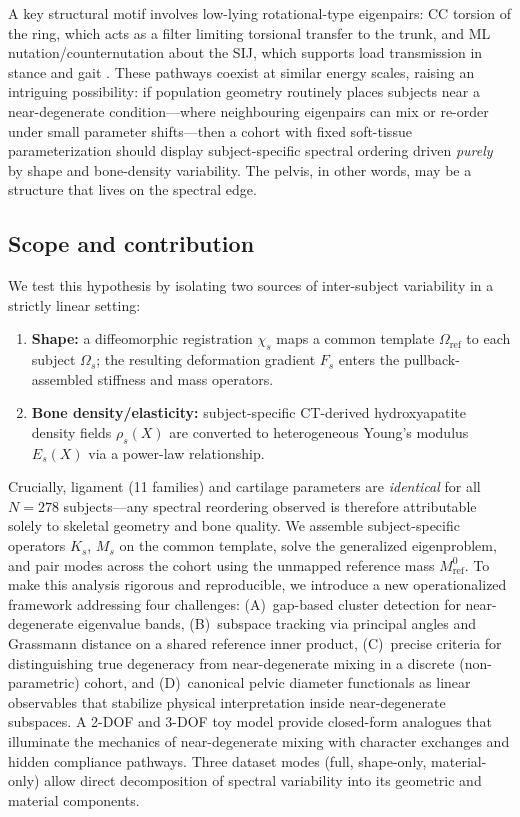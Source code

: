 \documentclass[11pt]{article}
\begin{document}
A key structural motif involves low-lying rotational-type eigenpairs: CC torsion of the ring, which acts as a filter limiting torsional transfer to the trunk, and ML nutation/counternutation about the SIJ, which supports load transmission in stance and gait \citep{Vleeming2012,Goode2008}.
These pathways coexist at similar energy scales, raising an intriguing possibility: if population geometry routinely places subjects near a near-degenerate condition---where neighbouring eigenpairs can mix or re-order under small parameter shifts---then a cohort with fixed soft-tissue parameterization should display subject-specific spectral ordering driven \emph{purely} by shape and bone-density variability.
The pelvis, in other words, may be a structure that lives on the spectral edge.

\subsection*{Scope and contribution}
We test this hypothesis by isolating two sources of inter-subject variability in a strictly linear setting:
\begin{enumerate}[leftmargin=1.8em]
\item \textbf{Shape:} a diffeomorphic registration $\chi_s$ maps a common template $\Omega_{\mathrm{ref}}$ to each subject $\Omega_s$; the resulting deformation gradient $F_s$ enters the pullback-assembled stiffness and mass operators.
\item \textbf{Bone density/elasticity:} subject-specific CT-derived hydroxyapatite density fields $\rho_s(X)$ are converted to heterogeneous Young's modulus $E_s(X)$ via a power-law relationship.
\end{enumerate}
Crucially, ligament (11 families) and cartilage parameters are \emph{identical} for all $N{=}278$ subjects---any spectral reordering observed is therefore attributable solely to skeletal geometry and bone quality.
We assemble subject-specific operators $K_s$, $M_s$ on the common template, solve the generalized eigenproblem, and pair modes across the cohort using the unmapped reference mass $M_{\mathrm{ref}}^{0}$.
To make this analysis rigorous and reproducible, we introduce a new operationalized framework addressing four challenges:
(A)~gap-based cluster detection for near-degenerate eigenvalue bands,
(B)~subspace tracking via principal angles and Grassmann distance on a shared reference inner product,
(C)~precise criteria for distinguishing true degeneracy from near-degenerate mixing in a discrete (non-parametric) cohort, and
(D)~canonical pelvic diameter functionals as linear observables that stabilize physical interpretation inside near-degenerate subspaces.
A 2-DOF and 3-DOF toy model provide closed-form analogues that illuminate the mechanics of near-degenerate mixing with character exchanges and hidden compliance pathways.
Three dataset modes (full, shape-only, material-only) allow direct decomposition of spectral variability into its geometric and material components.
\end{document}
